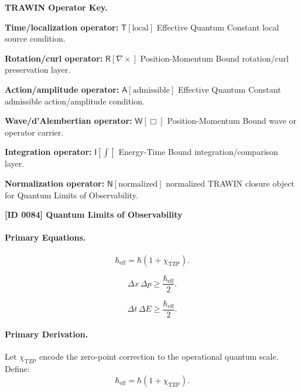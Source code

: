 \par\vspace{0.45\baselineskip}
\noindent\begin{minipage}[t]{\linewidth}
\begingroup
\small
\raggedright
\textbf{TRAWIN Operator Key.}\par
\noindent\textbf{Time/localization operator:} $\mathsf{T}\!\left[\mathrm{local}\right]$ Effective Quantum Constant local source condition.\par
\noindent\textbf{Rotation/curl operator:} $\mathsf{R}\!\left[\nabla\times\right]$ Position-Momentum Bound rotation/curl preservation layer.\par
\noindent\textbf{Action/amplitude operator:} $\mathsf{A}\!\left[\mathrm{admissible}\right]$ Effective Quantum Constant admissible action/amplitude condition.\par
\noindent\textbf{Wave/d'Alembertian operator:} $\mathsf{W}\!\left[\Box\right]$ Position-Momentum Bound wave or operator carrier.\par
\noindent\textbf{Integration operator:} $\mathsf{I}\!\left[\int\right]$ Energy-Time Bound integration/comparison layer.\par
\noindent\textbf{Normalization operator:} $\mathsf{N}\!\left[\mathrm{normalized}\right]$ normalized TRAWIN closure object for Quantum Limits of Observability.\par
\endgroup
\end{minipage}

\clearpage
\noindent\textbf{[ID 0084] Quantum Limits of Observability}\par
\vspace{0.35em}
\paragraph{Primary Equations.}
\begin{equation}
\hbar_{\mathrm{eff}}
=
\hbar(1+\chi_{\mathrm{TZP}}).
\end{equation}

\begin{equation}
\Delta x\,\Delta p
\geq
\frac{\hbar_{\mathrm{eff}}}{2}.
\end{equation}

\begin{equation}
\Delta t\,\Delta E
\geq
\frac{\hbar_{\mathrm{eff}}}{2}.
\end{equation}

\paragraph{Primary Derivation.}
Let $\chi_{\mathrm{TZP}}$ encode the zero-point correction to the operational quantum scale.  
Define:
\begin{equation}
\hbar_{\mathrm{eff}}
=
\hbar(1+\chi_{\mathrm{TZP}}).
\end{equation}

